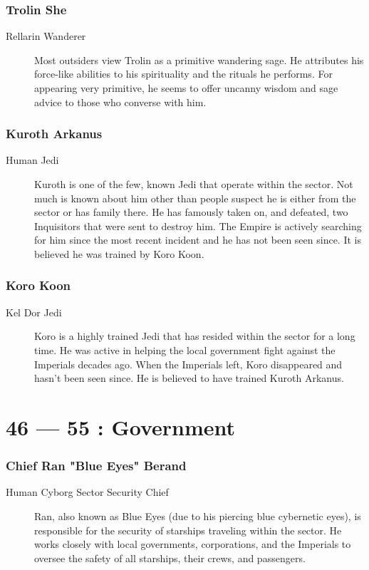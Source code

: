 \documentclass{article}
\begin{document}
\section{Trolin She}
\begin{description}
	\item [Rellarin \male Wanderer] Most outsiders view Trolin as a primitive wandering sage. He attributes his force-like abilities to his spirituality and the rituals he performs. For appearing very primitive, he seems to offer uncanny wisdom and sage advice to those who converse with him.
\end{description}
\section{Kuroth Arkanus}
\begin{description}
	\item [Human \male Jedi] Kuroth is one of the few, known Jedi that operate within the sector. Not much is known about him other than people suspect he is either from the sector or has family there. He has famously taken on, and defeated, two Inquisitors that were sent to destroy him. The Empire is actively searching for him since the most recent incident and he has not been seen since. It is believed he was trained by Koro Koon.
\end{description}
\section{Koro Koon}
\begin{description}
	\item [Kel Dor \male Jedi] Koro is a highly trained Jedi that has resided within the sector for a long time. He was active in helping the local government fight against the Imperials decades ago. When the Imperials left, Koro disappeared and hasn’t been seen since. He is believed to have trained Kuroth Arkanus.
\end{description}

\part*{46 --- 55 : Government}
\setcounter{section}{45}
\section{Chief Ran "Blue Eyes" Berand}
\begin{description}
	\item [Human Cyborg \male Sector Security Chief] Ran, also known as Blue Eyes (due to his piercing blue cybernetic eyes), is responsible for the security of starships traveling within the sector. He works closely with local governments, corporations, and the Imperials to oversee the safety of all starships, their crews, and passengers.
\end{description}
\end{document}
